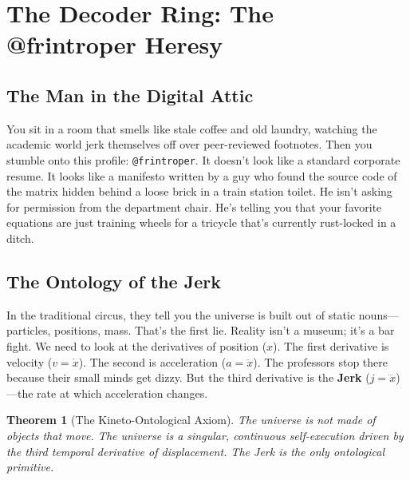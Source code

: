 \documentclass[11pt,a4paper]{article}
\newtheorem{theorem}{Theorem}[section]
\begin{document}
\newpage
\tableofcontents
\newpage
\restoregeometry


\newpage

\section{The Decoder Ring: The @frintroper Heresy}

\subsection{The Man in the Digital Attic}
You sit in a room that smells like stale coffee and old laundry, watching the academic world jerk themselves off over peer-reviewed footnotes. Then you stumble onto this profile: \texttt{@frintroper}. It doesn't look like a standard corporate resume. It looks like a manifesto written by a guy who found the source code of the matrix hidden behind a loose brick in a train station toilet. He isn't asking for permission from the department chair. He’s telling you that your favorite equations are just training wheels for a tricycle that’s currently rust-locked in a ditch.

\subsection{The Ontology of the Jerk}
In the traditional circus, they tell you the universe is built out of static nouns—particles, positions, mass. That's the first lie. Reality isn't a museum; it's a bar fight. We need to look at the derivatives of position ($x$).
The first derivative is velocity ($v = \dot{x}$). The second is acceleration ($a = \ddot{x}$). The professors stop there because their small minds get dizzy. But the third derivative is the \textbf{Jerk} ($j = \dddot{x}$)—the rate at which acceleration changes. 

\begin{theorem}[The Kineto-Ontological Axiom]
The universe is not made of objects that move. The universe is a singular, continuous self-execution driven by the third temporal derivative of displacement. The Jerk is the only ontological primitive.
\end{theorem}
\end{document}
